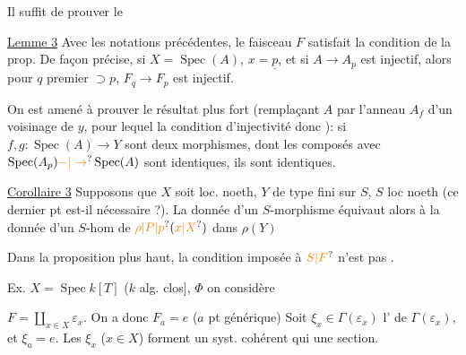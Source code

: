 Il suffit de prouver le

\uline{Lemme 3} Avec les notations précédentes, le faisceau $F$ satisfait la condition de la prop.  De façon précise,  si $X=\operatorname{Spec}(A)$, $x=\underline p$, et si $A\to A_p$ est injectif, alors pour  $q$ premier $\supset p$, $F_q\to F_p$ est injectif.

On est amené à prouver le résultat plus fort (remplaçant $A$ par l'anneau $A_f$ d'un voisinage de $y$, pour lequel la condition d'injectivité  donc ): si $f,g:\operatorname{Spec}(A)\longrightarrow Y$ sont deux morphismes, dont les composés avec $\operatorname{Spec}(A_p)\unsure{-|\to}\operatorname{Spec}(A)$ sont identiques, ils sont identiques.

\uline{Corollaire 3} Supposons que $X$ soit loc. noeth, $Y$  de type fini sur $S$, $S$ loc noeth (ce dernier pt est-il nécessaire ?). La donnée d'un $S$-morphisme équivaut alors à la donnée d'un $S$-hom de $\unsure{\rho|P|p}(\unsure{x|X})$ dans $\rho(Y)$

\uline{} Dans la proposition plus haut, la condition imposée à $\unsure{S|F}$ n'est pas .

Ex. $X=\operatorname{Spec}k[T]$ ($k$ alg. clos],      $\Phi$   on considère 

$F=\coprod_{x\in X}\varepsilon_x$. On a donc $F_a=e$ ($a$ pt générique) Soit $\xi_x\in\Gamma(\varepsilon_x)$ l'   de $\Gamma(\varepsilon_x)$, et $\xi_a=e$. Les $\xi_x$ ($x\in X$) forment un syst. cohérent qui   une section.
